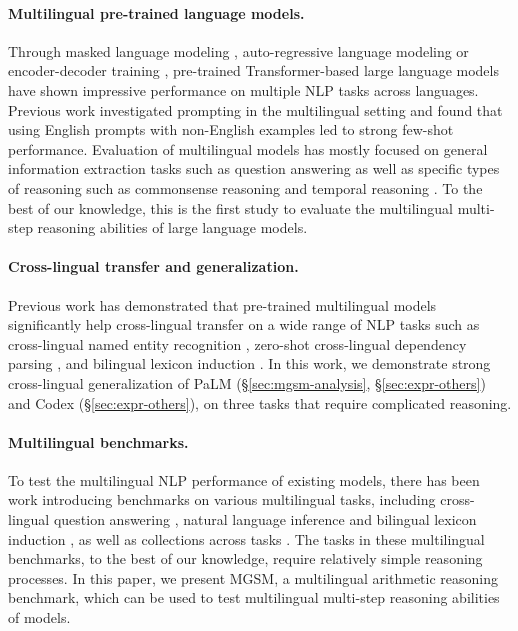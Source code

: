 \paragraph{Multilingual pre-trained language models.} Through masked language modeling \citep{devlin-etal-2019-bert,conneau-etal-2020-unsupervised}, auto-regressive language modeling \citep{brown2020language,ouyang2022training} or encoder-decoder training \citep{liu2020multilingual,chen2021evaluating,xue-etal-2021-mt5}, pre-trained Transformer-based large language models have shown impressive performance on multiple NLP tasks across languages. Previous work \citep{Zhao2021,Winata2021,Lin2021} investigated prompting in the multilingual setting and found that using English prompts with non-English examples led to strong few-shot performance. Evaluation of multilingual models has mostly focused on general information extraction tasks such as question answering \citep{clark-etal-2020-tydi,hu2020xtreme,Kassner2021,ruder2021multi} as well as specific types of reasoning such as commonsense reasoning \citep{ponti-etal-2020-xcopa,lin-etal-2021-common} and temporal reasoning \citep{ruder-etal-2021-xtreme}. To the best of our knowledge, this is the first study to evaluate the multilingual multi-step reasoning abilities of large language models.

\paragraph{Cross-lingual transfer and generalization.} Previous work has demonstrated that pre-trained multilingual models significantly help cross-lingual transfer on a wide range of NLP tasks such as cross-lingual named entity recognition \citep{pires-etal-2019-multilingual,mulcaire-etal-2019-polyglot}, zero-shot cross-lingual dependency parsing \citep{schuster-etal-2019-cross,shi-etal-2022-substructure}, and bilingual lexicon induction \citep{shi-etal-2021-bilingual}. In this work, we demonstrate strong cross-lingual generalization of PaLM (\S\ref{sec:mgsm-analysis}, \S\ref{sec:expr-others}) and Codex (\S\ref{sec:expr-others}), on three tasks that require complicated reasoning. 

\paragraph{Multilingual benchmarks.} To test the multilingual NLP performance of existing models, there has been work introducing benchmarks on various multilingual tasks, including cross-lingual question answering \citep{liu-etal-2019-xqa,clark-etal-2020-tydi}, natural language inference \citep{conneau-etal-2018-xnli} and bilingual lexicon induction \citep{lample2018word}, as well as collections across tasks \citep{hu2020xtreme,ruder-etal-2021-xtreme}. The tasks in these multilingual benchmarks, to the best of our knowledge, require relatively simple reasoning processes. In this paper, we present {MGSM}, a multilingual arithmetic reasoning benchmark, which can be used to test multilingual multi-step reasoning abilities of models. 

